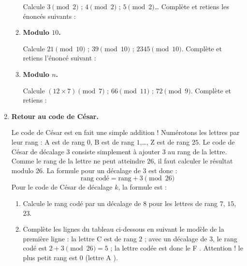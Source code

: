 \documentclass[class=report,crop=false, 12pt]{standalone}
\begin{document}
\begin{activite}[Modulo]
\begin{enumerate}
\begin{enumerate}
    Calcule $3 \pmod{2}$ ; $4 \pmod{2}$ ; $5 \pmod{2}$\ldots
    Complète et retiens les énoncés suivants :
    
    
           
    \item \textbf{Modulo $10$.}
    
    Calcule $21 \pmod{10}$ ; $39 \pmod{10}$ ; $2345 \pmod{10}$.
    Complète et retiens l'énoncé suivant :
    
    
    \item \textbf{Modulo $n$.}
    
    Calcule $(12\times 7) \pmod{7}$ ; $66 \pmod{11}$ ; $72 \pmod{9}$.
    Complète et retiens :
    
    
   \end{enumerate}
   
   
   \item \textbf{Retour au code de César.}  
   
   Le code de César est en fait une simple addition ! Numérotons les lettres par leur rang :
   \og A \fg{} est de rang $0$, \og B \fg{} est de rang $1$,\ldots, \og Z \fg{} est de rang $25$.
   Le code de César de décalage $3$ consiste simplement à ajouter $3$ au rang de la lettre. Comme le rang de la lettre ne peut atteindre $26$, il faut calculer le résultat modulo $26$.
   La formule pour un décalage de $3$ est donc :
   $$\text{rang codé} = \text{rang} + 3 \pmod{26}$$
   Pour le code de César de décalage $k$, la formule est :

  
   \begin{enumerate}
     \item Calcule le rang codé par un décalage de $8$ pour les lettres de rang $7$, $15$, $23$.
     \item Complète les lignes du tableau ci-dessous
     en suivant le modèle de la première ligne :
     la lettre \og C \fg{} est de rang $2$ ; avec un décalage de $3$, le rang codé est $2+3\pmod{26}=5$ ; la lettre codée est donc le \og F \fg{}. Attention ! le plus petit rang est $0$ (lettre \og A \fg{}).
     

\end{enumerate}
\end{enumerate}
\end{activite}
\end{document}
